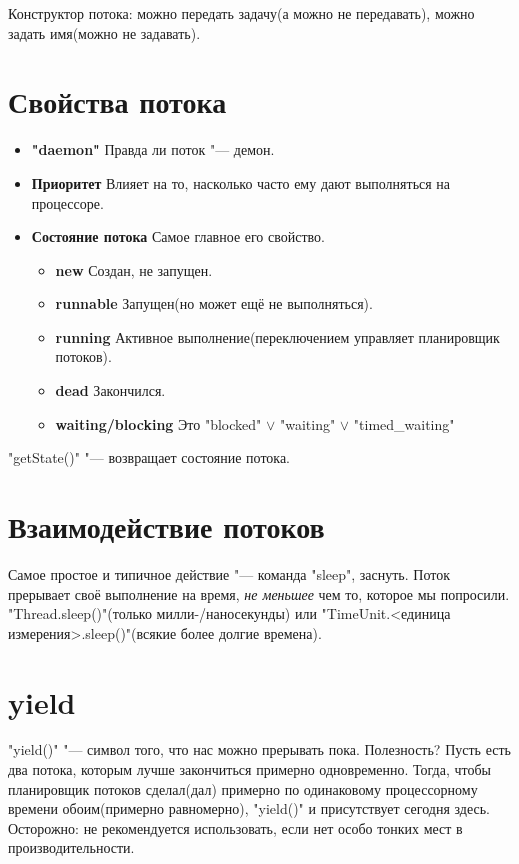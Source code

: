 Конструктор потока: можно передать задачу(а можно не передавать), можно задать имя(можно не задавать).


\section{Свойства потока}
\begin{itemize}
\item\textbf{\java"daemon"}
	Правда ли поток "--- демон.
\item\textbf{Приоритет}
	Влияет на то, насколько часто ему дают выполняться на процессоре.
\item\textbf{Состояние потока}
	Самое главное его свойство.
	\begin{itemize}
	\item\textbf{new}
		Создан, не запущен.
	\item\textbf{runnable}
		Запущен(но может ещё не выполняться).
	\item\textbf{running}
		Активное выполнение(переключением управляет планировщик потоков).
	\item\textbf{dead}
		Закончился.
	\item\textbf{waiting/blocking}
		Это \java"blocked" $\lor$ \java"waiting" $\lor$ \java"timed\_waiting"
	\end{itemize}
\end{itemize}

\java"getState()" "--- возвращает состояние потока.

\section{Взаимодействие потоков}
Самое простое и типичное действие "--- команда \java"sleep", заснуть. 
Поток прерывает своё выполнение на время, \textit{не меньшее} чем то,
которое мы попросили.
\java"Thread.sleep()"(только милли-/наносекунды) или \java"TimeUnit.<единица измерения>.sleep()"(всякие более долгие времена).

\section{yield}
\java"yield()" "--- символ того, что нас можно прерывать пока. 
Полезность? 
Пусть есть два потока, которым лучше закончиться примерно одновременно.
Тогда, чтобы планировщик потоков сделал(дал) примерно по одинаковому процессорному времени обоим(примерно равномерно),
\java"yield()" и присутствует сегодня здесь.
Осторожно: не рекомендуется использовать, если нет особо тонких мест в производительности.

